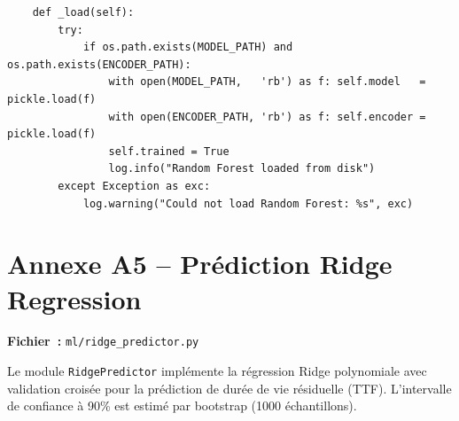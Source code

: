 \begin{lstlisting}
    def _load(self):
        try:
            if os.path.exists(MODEL_PATH) and os.path.exists(ENCODER_PATH):
                with open(MODEL_PATH,   'rb') as f: self.model   = pickle.load(f)
                with open(ENCODER_PATH, 'rb') as f: self.encoder = pickle.load(f)
                self.trained = True
                log.info("Random Forest loaded from disk")
        except Exception as exc:
            log.warning("Could not load Random Forest: %s", exc)
\end{lstlisting}

\section{Annexe A5 -- Prédiction Ridge Regression}
\label{annexe:ridge}

\textbf{Fichier~:} \texttt{ml/ridge\_predictor.py}

Le module \texttt{RidgePredictor} implémente la régression Ridge polynomiale avec validation croisée pour la prédiction de durée de vie résiduelle (TTF). L'intervalle de confiance à 90\% est estimé par bootstrap (1000 échantillons).

